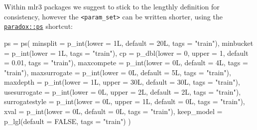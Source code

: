 \documentclass[
]{scrbook}
\newenvironment{Shaded}{\begin{snugshade}}{\end{snugshade}}
\newcommand{\AttributeTok}[1]{\textcolor[rgb]{0.77,0.63,0.00}{#1}}
\newcommand{\ConstantTok}[1]{\textcolor[rgb]{0.00,0.00,0.00}{#1}}
\newcommand{\DecValTok}[1]{\textcolor[rgb]{0.00,0.00,0.81}{#1}}
\newcommand{\FloatTok}[1]{\textcolor[rgb]{0.00,0.00,0.81}{#1}}
\newcommand{\FunctionTok}[1]{\textcolor[rgb]{0.00,0.00,0.00}{#1}}
\newcommand{\NormalTok}[1]{#1}
\newcommand{\OtherTok}[1]{\textcolor[rgb]{0.56,0.35,0.01}{#1}}
\newcommand{\StringTok}[1]{\textcolor[rgb]{0.31,0.60,0.02}{#1}}
\renewenvironment{Shaded} {\begin{snugshade}\small} {\end{snugshade}}
\begin{document}
Within mlr3 packages we suggest to stick to the lengthly definition for consistency, however the \texttt{\textless{}param\_set\textgreater{}} can be written shorter, using the \href{https://paradox.mlr-org.com/reference/ps.html}{\texttt{paradox::ps}} shortcut:

\begin{Shaded}
\begin{Highlighting}[]
\NormalTok{ps }\OtherTok{=} \FunctionTok{ps}\NormalTok{(}
  \AttributeTok{minsplit =} \FunctionTok{p\_int}\NormalTok{(}\AttributeTok{lower =}\NormalTok{ 1L, }\AttributeTok{default =}\NormalTok{ 20L, }\AttributeTok{tags =} \StringTok{"train"}\NormalTok{),}
  \AttributeTok{minbucket =} \FunctionTok{p\_int}\NormalTok{(}\AttributeTok{lower =}\NormalTok{ 1L, }\AttributeTok{tags =} \StringTok{"train"}\NormalTok{),}
  \AttributeTok{cp =} \FunctionTok{p\_dbl}\NormalTok{(}\AttributeTok{lower =} \DecValTok{0}\NormalTok{, }\AttributeTok{upper =} \DecValTok{1}\NormalTok{, }\AttributeTok{default =} \FloatTok{0.01}\NormalTok{, }\AttributeTok{tags =} \StringTok{"train"}\NormalTok{),}
  \AttributeTok{maxcompete =} \FunctionTok{p\_int}\NormalTok{(}\AttributeTok{lower =}\NormalTok{ 0L, }\AttributeTok{default =}\NormalTok{ 4L, }\AttributeTok{tags =} \StringTok{"train"}\NormalTok{),}
  \AttributeTok{maxsurrogate =} \FunctionTok{p\_int}\NormalTok{(}\AttributeTok{lower =}\NormalTok{ 0L, }\AttributeTok{default =}\NormalTok{ 5L, }\AttributeTok{tags =} \StringTok{"train"}\NormalTok{),}
  \AttributeTok{maxdepth =} \FunctionTok{p\_int}\NormalTok{(}\AttributeTok{lower =}\NormalTok{ 1L, }\AttributeTok{upper =}\NormalTok{ 30L, }\AttributeTok{default =}\NormalTok{ 30L, }\AttributeTok{tags =} \StringTok{"train"}\NormalTok{),}
  \AttributeTok{usesurrogate =} \FunctionTok{p\_int}\NormalTok{(}\AttributeTok{lower =}\NormalTok{ 0L, }\AttributeTok{upper =}\NormalTok{ 2L, }\AttributeTok{default =}\NormalTok{ 2L, }\AttributeTok{tags =} \StringTok{"train"}\NormalTok{),}
  \AttributeTok{surrogatestyle =} \FunctionTok{p\_int}\NormalTok{(}\AttributeTok{lower =}\NormalTok{ 0L, }\AttributeTok{upper =}\NormalTok{ 1L, }\AttributeTok{default =}\NormalTok{ 0L, }\AttributeTok{tags =} \StringTok{"train"}\NormalTok{),}
  \AttributeTok{xval =} \FunctionTok{p\_int}\NormalTok{(}\AttributeTok{lower =}\NormalTok{ 0L, }\AttributeTok{default =}\NormalTok{ 0L, }\AttributeTok{tags =} \StringTok{"train"}\NormalTok{),}
  \AttributeTok{keep\_model =} \FunctionTok{p\_lgl}\NormalTok{(}\AttributeTok{default =} \ConstantTok{FALSE}\NormalTok{, }\AttributeTok{tags =} \StringTok{"train"}\NormalTok{)}
\NormalTok{)}
\end{Highlighting}
\end{Shaded}
\end{document}
